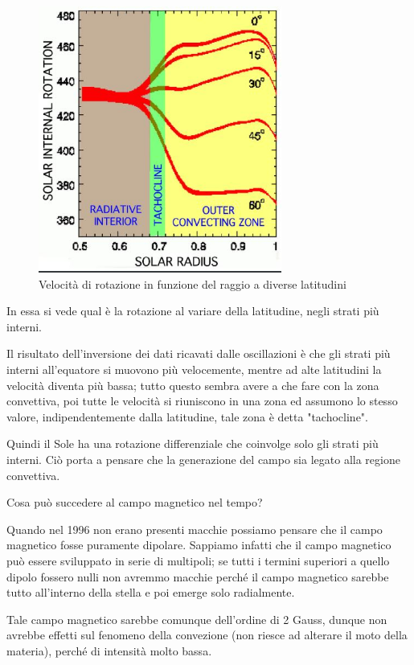\begin{figure}[H]
    \centering
    \includegraphics[width=8cm]{2dic/Tachocline.jpg}
    \caption{Velocità di rotazione in funzione del raggio a diverse latitudini}
    \label{fig:VelRotDiff}
\end{figure}

In essa si vede qual è la rotazione al variare della latitudine, negli strati più interni.

Il risultato dell'inversione dei dati ricavati dalle oscillazioni è che gli strati più interni all'equatore si muovono più velocemente, mentre ad alte latitudini la velocità diventa più bassa; tutto questo sembra avere a che fare con la zona convettiva, poi tutte le velocità si riuniscono in una zona ed assumono lo stesso valore, indipendentemente dalla latitudine, tale zona è detta "tachocline".

Quindi il Sole ha una rotazione differenziale che coinvolge solo gli strati più interni. Ciò porta a pensare che la generazione del campo sia legato alla regione convettiva.

Cosa può succedere al campo magnetico nel tempo?

Quando nel 1996 non erano presenti macchie possiamo pensare che il campo magnetico fosse puramente dipolare. Sappiamo infatti che il campo magnetico può essere sviluppato in serie di multipoli; se tutti i termini superiori a quello dipolo fossero nulli non avremmo macchie perché il campo magnetico sarebbe tutto all'interno della stella e poi emerge solo radialmente.

Tale campo magnetico sarebbe comunque dell'ordine di 2 Gauss, dunque non avrebbe effetti sul fenomeno della convezione (non riesce ad alterare il moto della materia), perché di intensità molto bassa.

